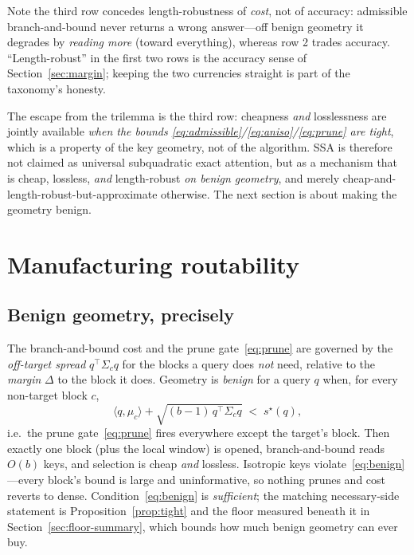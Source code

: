 \documentclass[11pt]{article}
\numberwithin{equation}{section}
\newcommand{\inner}[2]{\langle #1, #2\rangle}
\begin{document}
Note the third row concedes length-robustness of \emph{cost}, not of accuracy: admissible branch-and-bound
never returns a wrong answer---off benign geometry it degrades by \emph{reading more} (toward everything),
whereas row 2 trades accuracy. ``Length-robust'' in the first two rows is the accuracy sense of
Section~\ref{sec:margin}; keeping the two currencies straight is part of the taxonomy's honesty.

The escape from the trilemma is the third row: cheapness \emph{and} losslessness are jointly available
\emph{when the bounds \eqref{eq:admissible}/\eqref{eq:aniso}/\eqref{eq:prune} are tight}, which is a property of
the key geometry, not of the algorithm. SSA is therefore not claimed as universal subquadratic exact attention,
but as a mechanism that is cheap, lossless, \emph{and} length-robust \emph{on benign geometry}, and
merely cheap-and-length-robust-but-approximate otherwise. The next section is about making the geometry benign.

\section{Manufacturing routability}\label{sec:routability}

\subsection{Benign geometry, precisely}

The branch-and-bound cost and the prune gate~\eqref{eq:prune} are governed by the \emph{off-target spread}
$q^\top\Sigma_c q$ for the blocks a query does \emph{not} need, relative to the \emph{margin} $\Delta$ to the
block it does. Geometry is \emph{benign} for a query $q$ when, for every non-target block $c$,
\begin{equation}\label{eq:benign}
\inner{q}{\mu_c} + \sqrt{(b-1)\,q^\top\Sigma_c q}\;<\; s^\star(q),
\end{equation}
i.e.\ the prune gate~\eqref{eq:prune} fires everywhere except the target's block. Then exactly one block (plus
the local window) is opened, branch-and-bound reads $O(b)$ keys, and selection is cheap \emph{and} lossless.
Isotropic keys violate~\eqref{eq:benign}---every block's bound is large and uninformative, so nothing prunes
and cost reverts to dense. Condition~\eqref{eq:benign} is \emph{sufficient}; the matching necessary-side
statement is Proposition~\ref{prop:tight} and the floor measured beneath it in
Section~\ref{sec:floor-summary}, which bounds how much benign geometry can ever buy.
\end{document}
